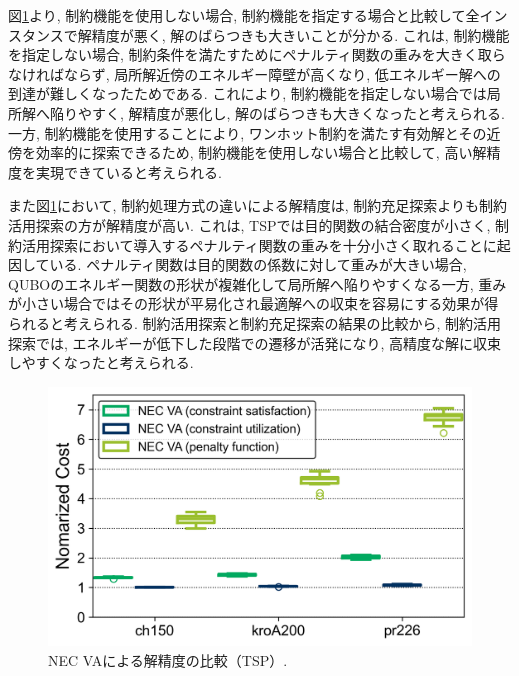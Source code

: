 \documentclass[submit,techrep,noauthor]{ipsj}
\begin{document}
図\ref{Cost_TSP_VA}より, 制約機能を使用しない場合, 制約機能を指定する場合と比較して全インスタンスで解精度が悪く, 解のばらつきも大きいことが分かる. これは, 制約機能を指定しない場合, 制約条件を満たすためにペナルティ関数の重みを大きく取らなければならず, 局所解近傍のエネルギー障壁が高くなり, 低エネルギー解への到達が難しくなったためである. これにより, 制約機能を指定しない場合では局所解へ陥りやすく, 解精度が悪化し, 解のばらつきも大きくなったと考えられる.
一方, 制約機能を使用することにより, ワンホット制約を満たす有効解とその近傍を効率的に探索できるため, 制約機能を使用しない場合と比較して, 高い解精度を実現できていると考えられる.

また図\ref{Cost_TSP_VA}において, 制約処理方式の違いによる解精度は, 制約充足探索よりも制約活用探索の方が解精度が高い. これは, TSPでは目的関数の結合密度が小さく, 制約活用探索において導入するペナルティ関数の重みを十分小さく取れることに起因している. ペナルティ関数は目的関数の係数に対して重みが大きい場合, QUBOのエネルギー関数の形状が複雑化して局所解へ陥りやすくなる一方, 重みが小さい場合ではその形状が平易化され最適解への収束を容易にする効果が得られると考えられる. 制約活用探索と制約充足探索の結果の比較から, 制約活用探索では, エネルギーが低下した段階での遷移が活発になり, 高精度な解に収束しやすくなったと考えられる.


\begin{figure}[tb]
\centering
\includegraphics[bb=0 0 700 230, width=15cm]{Cost_TSP_VA.png}
\caption{NEC VAによる解精度の比較（TSP）.}
\label{Cost_TSP_VA}
\end{figure}
\end{document}

